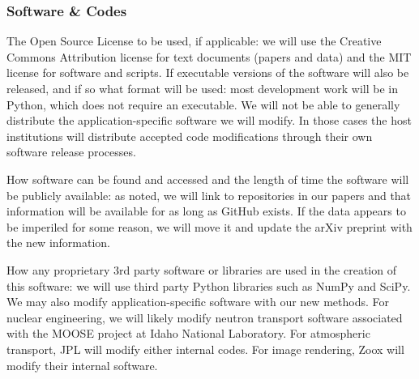 \documentclass[12pt]{article}
\begin{document}
\subsubsection*{Software \& Codes}\vspace{-15pt}
The Open Source License to be used, if applicable: we will use the Creative Commons Attribution license for text documents (papers and data) and the MIT license for software and scripts. If executable versions of the software will also be released, and if so what format will be used: most development work will be in Python, which does not require an executable. We will not be able to generally distribute the application-specific software we will modify. In those cases the host institutions will distribute accepted code modifications through their own software release processes.

How software can be found and accessed and the length of time the software will be publicly available: as noted, we will link to repositories in our papers and that information will be available for as long as GitHub exists. If the data appears to be imperiled for some reason, we will move it and update the arXiv preprint with the new information. 

How any proprietary 3rd party software or libraries are used in the creation of this software: we will use third party Python libraries such as NumPy and SciPy. We may also modify application-specific software with our new methods. For nuclear engineering, we will likely modify neutron transport software associated with the MOOSE project at Idaho National Laboratory. For atmospheric transport, JPL will modify either internal codes. For image rendering, Zoox will modify their internal software. 
 
\end{document}
